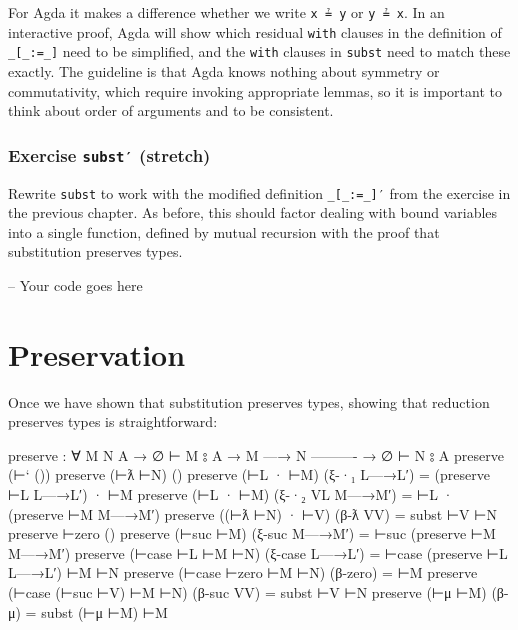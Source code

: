 For Agda it makes a difference whether we write \texttt{x\ ≟\ y} or
\texttt{y\ ≟\ x}. In an interactive proof, Agda will show which residual
\texttt{with} clauses in the definition of \texttt{\_{[}\_:=\_{]}} need
to be simplified, and the \texttt{with} clauses in \texttt{subst} need
to match these exactly. The guideline is that Agda knows nothing about
symmetry or commutativity, which require invoking appropriate lemmas, so
it is important to think about order of arguments and to be consistent.

\hypertarget{exercise-subst-stretch}{%
\subsubsection{\texorpdfstring{Exercise \texttt{subst′}
(stretch)}{Exercise subst′ (stretch)}}\label{exercise-subst-stretch}}

Rewrite \texttt{subst} to work with the modified definition
\texttt{\_{[}\_:=\_{]}′} from the exercise in the previous chapter. As
before, this should factor dealing with bound variables into a single
function, defined by mutual recursion with the proof that substitution
preserves types.

\begin{fence}
\begin{code}
-- Your code goes here
\end{code}
\end{fence}

\hypertarget{preservation}{%
\section{Preservation}\label{preservation}}

Once we have shown that substitution preserves types, showing that
reduction preserves types is straightforward:

\begin{fence}
\begin{code}
preserve : ∀ {M N A}
  → ∅ ⊢ M ⦂ A
  → M —→ N
    ----------
  → ∅ ⊢ N ⦂ A
preserve (⊢` ())
preserve (⊢ƛ ⊢N)                 ()
preserve (⊢L · ⊢M)               (ξ-·₁ L—→L′)     =  (preserve ⊢L L—→L′) · ⊢M
preserve (⊢L · ⊢M)               (ξ-·₂ VL M—→M′)  =  ⊢L · (preserve ⊢M M—→M′)
preserve ((⊢ƛ ⊢N) · ⊢V)          (β-ƛ VV)         =  subst ⊢V ⊢N
preserve ⊢zero                   ()
preserve (⊢suc ⊢M)               (ξ-suc M—→M′)    =  ⊢suc (preserve ⊢M M—→M′)
preserve (⊢case ⊢L ⊢M ⊢N)        (ξ-case L—→L′)   =  ⊢case (preserve ⊢L L—→L′) ⊢M ⊢N
preserve (⊢case ⊢zero ⊢M ⊢N)     (β-zero)         =  ⊢M
preserve (⊢case (⊢suc ⊢V) ⊢M ⊢N) (β-suc VV)       =  subst ⊢V ⊢N
preserve (⊢μ ⊢M)                 (β-μ)            =  subst (⊢μ ⊢M) ⊢M
\end{code}
\end{fence}

